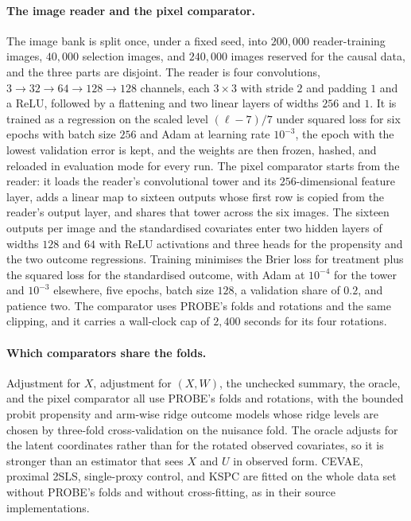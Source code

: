 {\paragraph{The image reader and the pixel comparator.} The image bank is split once, under a fixed seed, into $200{,}000$ reader-training images, $40{,}000$ selection images, and $240{,}000$ images reserved for the causal data, and the three parts are disjoint. The reader is four convolutions, $3\to32\to64\to128\to128$ channels, each $3\times3$ with stride $2$ and padding $1$ and a ReLU, followed by a flattening and two linear layers of widths $256$ and $1$. It is trained as a regression on the scaled level $(\ell-7)/7$ under squared loss for six epochs with batch size $256$ and Adam at learning rate $10^{-3}$, the epoch with the lowest validation error is kept, and the weights are then frozen, hashed, and reloaded in evaluation mode for every run. The pixel comparator starts from the reader: it loads the reader's convolutional tower and its $256$-dimensional feature layer, adds a linear map to sixteen outputs whose first row is copied from the reader's output layer, and shares that tower across the six images. The sixteen outputs per image and the standardised covariates enter two hidden layers of widths $128$ and $64$ with ReLU activations and three heads for the propensity and the two outcome regressions. Training minimises the Brier loss for treatment plus the squared loss for the standardised outcome, with Adam at $10^{-4}$ for the tower and $10^{-3}$ elsewhere, five epochs, batch size $128$, a validation share of $0.2$, and patience two. The comparator uses PROBE's folds and rotations and the same clipping, and it carries a wall-clock cap of $2{,}400$ seconds for its four rotations.

\paragraph{Which comparators share the folds.} Adjustment for $X$, adjustment for $(X,W)$, the unchecked summary, the oracle, and the pixel comparator all use PROBE's folds and rotations, with the bounded probit propensity and arm-wise ridge outcome models whose ridge levels are chosen by three-fold cross-validation on the nuisance fold. The oracle adjusts for the latent coordinates rather than for the rotated observed covariates, so it is stronger than an estimator that sees $X$ and $U$ in observed form. CEVAE, proximal 2SLS, single-proxy control, and KSPC are fitted on the whole data set without PROBE's folds and without cross-fitting, as in their source implementations.

}
